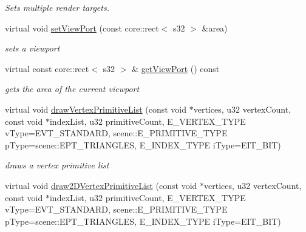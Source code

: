\begin{DoxyCompactItemize}
\begin{DoxyCompactList}\small\item\em Sets multiple render targets. \end{DoxyCompactList}\item 
\hypertarget{classirr_1_1video_1_1_c_null_driver_af419c86cbf47301db231312e387af3e6}{virtual void \hyperlink{classirr_1_1video_1_1_c_null_driver_af419c86cbf47301db231312e387af3e6}{set\-View\-Port} (const core\-::rect$<$ s32 $>$ \&area)}\label{classirr_1_1video_1_1_c_null_driver_af419c86cbf47301db231312e387af3e6}

\begin{DoxyCompactList}\small\item\em sets a viewport \end{DoxyCompactList}\item 
\hypertarget{classirr_1_1video_1_1_c_null_driver_a5c00df3f730a0c340601ef7a3377be46}{virtual const core\-::rect$<$ s32 $>$ \& \hyperlink{classirr_1_1video_1_1_c_null_driver_a5c00df3f730a0c340601ef7a3377be46}{get\-View\-Port} () const }\label{classirr_1_1video_1_1_c_null_driver_a5c00df3f730a0c340601ef7a3377be46}

\begin{DoxyCompactList}\small\item\em gets the area of the current viewport \end{DoxyCompactList}\item 
\hypertarget{classirr_1_1video_1_1_c_null_driver_a352f5e63b1fa3cb2016f676e9e81e018}{virtual void \hyperlink{classirr_1_1video_1_1_c_null_driver_a352f5e63b1fa3cb2016f676e9e81e018}{draw\-Vertex\-Primitive\-List} (const void $\ast$vertices, u32 vertex\-Count, const void $\ast$index\-List, u32 primitive\-Count, E\-\_\-\-V\-E\-R\-T\-E\-X\-\_\-\-T\-Y\-P\-E v\-Type=E\-V\-T\-\_\-\-S\-T\-A\-N\-D\-A\-R\-D, scene\-::\-E\-\_\-\-P\-R\-I\-M\-I\-T\-I\-V\-E\-\_\-\-T\-Y\-P\-E p\-Type=scene\-::\-E\-P\-T\-\_\-\-T\-R\-I\-A\-N\-G\-L\-E\-S, E\-\_\-\-I\-N\-D\-E\-X\-\_\-\-T\-Y\-P\-E i\-Type=E\-I\-T\-\_\-B\-I\-T)}\label{classirr_1_1video_1_1_c_null_driver_a352f5e63b1fa3cb2016f676e9e81e018}

\begin{DoxyCompactList}\small\item\em draws a vertex primitive list \end{DoxyCompactList}\item 
\hypertarget{classirr_1_1video_1_1_c_null_driver_aad75956412f9a4cec736807e279aeb02}{virtual void \hyperlink{classirr_1_1video_1_1_c_null_driver_aad75956412f9a4cec736807e279aeb02}{draw2\-D\-Vertex\-Primitive\-List} (const void $\ast$vertices, u32 vertex\-Count, const void $\ast$index\-List, u32 primitive\-Count, E\-\_\-\-V\-E\-R\-T\-E\-X\-\_\-\-T\-Y\-P\-E v\-Type=E\-V\-T\-\_\-\-S\-T\-A\-N\-D\-A\-R\-D, scene\-::\-E\-\_\-\-P\-R\-I\-M\-I\-T\-I\-V\-E\-\_\-\-T\-Y\-P\-E p\-Type=scene\-::\-E\-P\-T\-\_\-\-T\-R\-I\-A\-N\-G\-L\-E\-S, E\-\_\-\-I\-N\-D\-E\-X\-\_\-\-T\-Y\-P\-E i\-Type=E\-I\-T\-\_\-B\-I\-T)}\label{classirr_1_1video_1_1_c_null_driver_aad75956412f9a4cec736807e279aeb02}


\end{DoxyCompactItemize}
